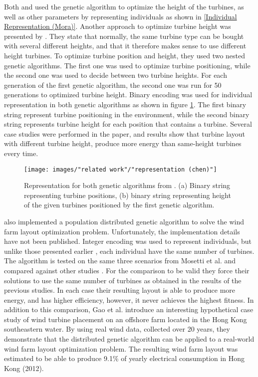 \noindent Both \cite{Mora} and \cite{Gonzalez} used the genetic algorithm to optimize the height of the turbines, as well as other parameters by representing individuals as shown in \ref{Individual Representation (Mora)}. Another approach to optimize turbine height was presented by \cite{Chen}. They state that normally, the same turbine type can be bought with several different heights, and that it therefore makes sense to use different height turbines. To optimize turbine position and height, they used two nested genetic algorithms. The first one was used to optimize turbine positioning, while the second one was used to decide between two turbine heights. For each generation of the first genetic algorithm, the second one was run for 50 generations to optimized turbine height. Binary encoding was used for individual representation in both genetic algorithms as shown in figure \ref{Representation (Chen)}. The first binary string represent turbine positioning in the environment, while the second binary string represents turbine height for each position that contains a turbine. Several case studies were performed in the paper, and results show that turbine layout with different turbine height, produce more energy than same-height turbines every time. \\


\begin{figure}[h!]
\begin{center}
\texttt{[image: images/"related work"/"representation (chen)"]}
\caption{Representation for both genetic algorithms from \citep{Chen}. (a) Binary string representing turbine positions, (b) binary string representing height of the given turbines positioned by the first genetic algorithm.}
\label{Representation (Chen)}
\end{center}
\end{figure}


\noindent \cite{Gao} also implemented a population distributed genetic algorithm to solve the wind farm layout optimization problem. Unfortunately, the implementation details have not been published. Integer encoding was used to represent individuals, but unlike those presented earlier \citep{Mora, Kusiak, Gonzalez, Saavedra-Morena}, each individual have the same number of turbines. The algorithm is tested on the same three scenarios from Mosetti et al. and compared against other studies \citep{Mosetti, Grady, Gonzalez, Wan}. For the comparison to be valid they force their solutions to use the same number of turbines as obtained in the results of the previous studies. In each case their resulting layout is able to produce more energy, and has higher efficiency, however, it never achieves the highest fitness. In addition to this comparison, Gao et al. introduce an interesting hypothetical case study of wind turbine placement on an offshore farm located in the Hong Kong southeastern water. By using real wind data, collected over 20 years, they demonstrate that the distributed genetic algorithm can be applied to a real-world wind farm layout optimization problem. The resulting wind farm layout was estimated to be able to produce 9.1\% of yearly electrical consumption in Hong Kong (2012).


